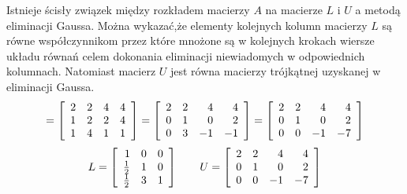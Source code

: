 \documentclass[11pt,a4paper,final]{article}
\author{Krzysztof Stasiowski}
\begin{document}
Istnieje ścisły związek między rozkładem macierzy $A$ na macierze $L$ i $U$
a metodą eliminacji Gaussa.
Można wykazać,że elementy kolejnych kolumn macierzy $L$ są równe współczynnikom przez które mnożone są w kolejnych krokach wiersze układu równań celem dokonania eliminacji niewiadomych w odpowiednich kolumnach. Natomiast macierz $U$ jest równa macierzy trójkątnej uzyskanej w eliminacji Gaussa.
\begin{equation*}
[A|b]=
\left[\begin{array}[c]{rrrr}
2&2&4&4\\
1&2&2&4\\
1&4&1&1
\end{array}\right]
=
\left[\begin{array}[c]{rrrr}
2&2&4&4\\
0&1&0&2\\
0&3&-1&-1
\end{array}\right]
=
\left[\begin{array}[c]{rrrr}
2&2&4&4\\
0&1&0&2\\
0&0&-1&-7
\end{array}\right]
\end{equation*}
\begin{equation*}
L=
\left[\begin{array}[c]{rrr}
1&0&0\\
\frac{1}{2}&1&0\\
\frac{1}{2}&3&1
\end{array}\right]
%
\qquad
U=
\left[\begin{array}[c]{rrrr}
2&2&4&4\\
0&1&0&2\\
0&0&-1&-7
\end{array}\right]
\end{equation*}
\end{document}
